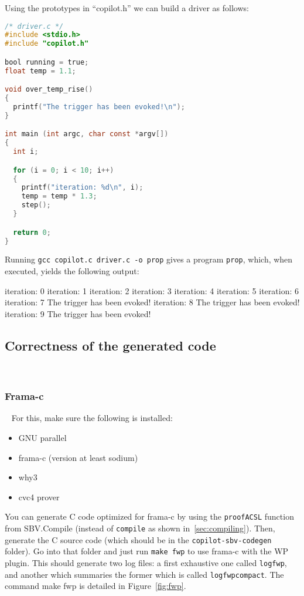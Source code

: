 Using the prototypes in ``copilot.h'' we can build a driver as follows:

\begin{lstlisting}[language = C]
/* driver.c */
#include <stdio.h>
#include "copilot.h"

bool running = true;
float temp = 1.1;

void over_temp_rise()
{
  printf("The trigger has been evoked!\n");
}

int main (int argc, char const *argv[])
{
  int i;

  for (i = 0; i < 10; i++)
  {
    printf("iteration: %d\n", i);
    temp = temp * 1.3;
    step();
  }

  return 0;
}
\end{lstlisting}

Running {\tt gcc copilot.c driver.c -o prop} gives a program {\tt prop}, which,
when executed, yields the following output:
%
\begin{code}
iteration: 0
iteration: 1
iteration: 2
iteration: 3
iteration: 4
iteration: 5
iteration: 6
iteration: 7
The trigger has been evoked!
iteration: 8
The trigger has been evoked!
iteration: 9
The trigger has been evoked!
\end{code}
%

\subsection{Correctness of the generated code}~\label{sec:correctness}

\subsubsection{Frama-c}~\label{subsec:frama-c}
For this, make sure the following is installed:

\begin{itemize}
	\item GNU parallel
	\item frama-c (version at least sodium)
	\item why3
	\item cvc4 prover
\end{itemize}

You can generate C code optimized for frama-c by using the \texttt{proofACSL}
function from SBV.Compile (instead of \texttt{compile} as shown
in~\ref{sec:compiling}). Then, generate the C source code (which should be in
the \texttt{copilot-sbv-codegen} folder). Go into that folder and just run
\texttt{make fwp} to use frama-c with the WP plugin. This should generate two
log files: a first exhaustive one called \texttt{logfwp}, and another which
summaries the former which is called \texttt{logfwpcompact}. The command make
fwp is detailed in Figure~\ref{fig:fwp}.


